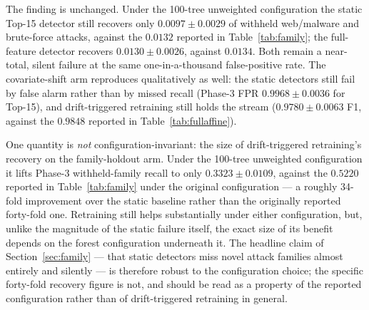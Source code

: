 \documentclass[11pt,a4paper]{article}
\begin{document}
The finding is unchanged. Under the 100-tree unweighted configuration the
static Top-15 detector still recovers only $0.0097 \pm 0.0029$ of withheld
web/malware and brute-force attacks, against the $0.0132$ reported in
Table~\ref{tab:family}; the full-feature detector recovers $0.0130 \pm
0.0026$, against $0.0134$. Both remain a near-total, silent failure at the
same one-in-a-thousand false-positive rate. The covariate-shift arm
reproduces qualitatively as well: the static detectors still fail by false
alarm rather than by missed recall (Phase-3 FPR $0.9968 \pm 0.0036$ for
Top-15), and drift-triggered retraining still holds the stream ($0.9780 \pm
0.0063$ F1, against the $0.9848$ reported in Table~\ref{tab:fullaffine}).

One quantity is \emph{not} configuration-invariant: the size of
drift-triggered retraining's recovery on the family-holdout arm. Under the
100-tree unweighted configuration it lifts Phase-3 withheld-family recall to
only $0.3323 \pm 0.0109$, against the $0.5220$ reported in
Table~\ref{tab:family} under the original configuration --- a roughly
34-fold improvement over the static baseline rather than the originally
reported forty-fold one. Retraining still helps substantially under either
configuration, but, unlike the magnitude of the static failure itself, the
exact size of its benefit depends on the forest configuration underneath it.
The headline claim of Section~\ref{sec:family} --- that static detectors miss
novel attack families almost entirely and silently --- is therefore robust to
the configuration choice; the specific forty-fold recovery figure is not, and
should be read as a property of the reported configuration rather than of
drift-triggered retraining in general.
\end{document}
